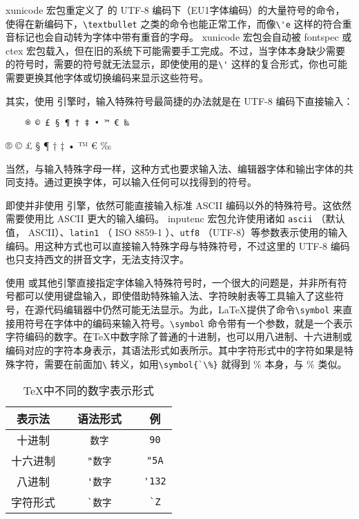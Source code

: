 xunicode 宏包重定义了 \XeTeX 的 UTF-8 编码下（EU1字体编码）的大量符号的命令，使得在新编码下，\verb|\textbullet| 之类的命令也能正常工作，而像\verb|\'e|  这样的符合重音标记也会自动转为字体中带有重音的字母。 xunicode 宏包会自动被 fontspec 或 ctex 宏包载入，但在旧的系统下可能需要手工完成。不过，当字体本身缺少需要的符号时，需要的符号就无法显示，即使使用的是\verb|\'| 这样的复合形式，你也可能需要更换其他字体或切换编码来显示这些符号。

其实，使用 \XeTeX 引擎时，输入特殊符号最简捷的办法就是在 UTF-8 编码下直接输入：

\begin{minipage}[t]{0.45\textwidth}
\begin{lstlisting}
    ® © £ § ¶ † ‡ • ™ € ‰
\end{lstlisting}
\end{minipage}
\hfill
\begin{minipage}[t]{0.45\textwidth}
    ® © £ § ¶ † ‡ • ™ € ‰
\end{minipage}

当然，与输入特殊字母一样，这种方式也要求输入法、编辑器字体和输出字体的共同支持。通过更换字体，可以输入任何可以找得到的符号。

即使并非使用 \XeTeX 引擎，依然可能直接输入标准 ASCII 编码以外的特殊符号。这依然需要使用比 ASCII 更大的输入编码。 inputenc 宏包允许使用诸如 \verb|ascii| （默认值， ASCII）、\verb|latin1| （ ISO 8859-1 ）、\verb|utf8| （UTF-8）等参数表示使用的输入编码。用这种方式也可以直接输入特殊字母与特殊符号，不过这里的 UTF-8 编码也只支持西文的拼音文字，无法支持汉字。

使用 \XeTeX 或其他引擎直接指定字体输入特殊符号时，一个很大的问题是，并非所有符号都可以使用键盘输入，即使借助特殊输入法、字符映射表等工具输入了这些符号，在源代码编辑器中仍然可能无法显示。为此，\LaTeX 提供了命令\verb|\symbol| 来直接用符号在字体中的编码来输入符号。\verb|\symbol| 命令带有一个参数，就是一个表示字符编码的数字。在\TeX 中数字除了普通的十进制，也可以用八进制、十六进制或编码对应的字符本身表示，其语法形式如表所示。其中字符形式中的字符如果是特殊字符，需要在前面加\verb|\| 转义，如用\verb|\symbol{`\%}| 就得到 \% 本身，与 \% 类似。

\begin{table}[H]
    \centering
    \caption{\TeX 中不同的数字表示形式}
    \label{tab:number}
    \begin{tabular}{ccccc}
        \toprule
        表示法 && 语法形式 && 例 \\ 
        \midrule
        十进制 && \verb|数字| && \verb|90| \\ 
        十六进制 && \verb|"数字| && \verb|"5A| \\ 
        八进制 && \verb|'数字| && \verb|'132| \\ 
        字符形式 && \verb|`数字| && \verb|`Z| \\
        \bottomrule
    \end{tabular}
\end{table}

